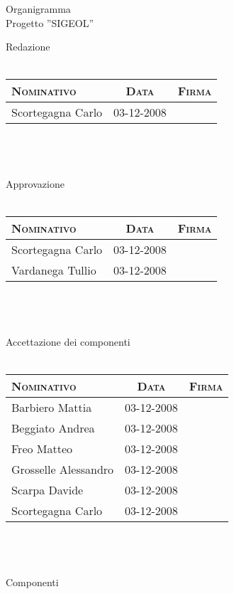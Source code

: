 \documentclass[11pt,a4paper]{article}
\begin{document}
\begin{center}
	\Huge Organigramma \\
	\Large Progetto ''SIGEOL'' \\
\end{center}
\Large Redazione \\ \\
\normalsize
\begin{tabular}{|p{}|c|p{}|}
\hline
\textsc{Nominativo} & \textsc{Data} & \textsc{Firma} \\
\hline
\hline
Scortegagna Carlo & 03-12-2008 & \\
\hline
\end{tabular} \\ \\ \\
\Large Approvazione \\ \\
\normalsize
\begin{tabular}{|p{}|c|p{}|}
\hline
\textsc{Nominativo} & \textsc{Data} & \textsc{Firma} \\
\hline
\hline
Scortegagna Carlo & 03-12-2008 & \\
\hline
Vardanega Tullio & 03-12-2008 & \\
\hline
\end{tabular} \\ \\ \\
\Large Accettazione dei componenti \\ \\
\normalsize
\begin{tabular}{|p{}|c|p{}|}
\hline
\textsc{Nominativo} & \textsc{Data} & \textsc{Firma} \\
\hline
\hline
Barbiero Mattia & 03-12-2008 & \\
\hline
Beggiato Andrea & 03-12-2008 & \\
\hline
Freo Matteo & 03-12-2008 & \\
\hline
Grosselle Alessandro & 03-12-2008 & \\
\hline
Scarpa Davide & 03-12-2008 & \\
\hline
Scortegagna Carlo & 03-12-2008 & \\
\hline
\end{tabular} \\ \\ \\
\Large Componenti \\ \\
\end{document}
